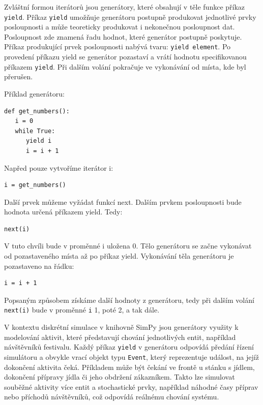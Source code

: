 \documentclass[12pt,a4paper]{article}
\begin{document}
Zvláštní formou iterátorů jsou generátory, které obsahují v těle funkce příkaz \texttt{yield}. Příkaz \texttt{yield} umožňuje generátoru postupně produkovat jednotlivé prvky posloupnosti a může teoreticky produkovat i nekonečnou posloupnost dat. Posloupnost zde znamená řadu hodnot, které generátor postupně poskytuje. Příkaz produkující prvek posloupnosti nabývá tvaru: \texttt{yield element}. Po provedení příkazu yield se generátor pozastaví a vrátí hodnotu specifikovanou příkazem \texttt{yield}. Při dalším volání pokračuje ve vykonávání od místa, kde byl přerušen.

\noindent Příklad generátoru:
 \begin{verbatim} 
def get_numbers():
   i = 0
   while True:
      yield i
      i = i + 1
\end{verbatim}
Napřed pouze vytvoříme iterátor i: 
 \begin{verbatim} 
i = get_numbers()
\end{verbatim}
Další prvek můžeme vyžádat funkcí next. 
Dalším prvkem posloupnosti bude hodnota určená příkazem yield. Tedy:
 \begin{verbatim} 
next(i)
\end{verbatim}
V tuto chvíli bude v proměnné i uložena 0. Tělo generátoru se začne vykonávat od pozastaveného místa až po příkaz yield.  Vykonávání těla generátoru je pozastaveno na řádku:
 \begin{verbatim} 
i = i + 1
\end{verbatim}
Popsaným způsobem získáme další hodnoty z generátoru, tedy při dalším volání \texttt{next(i)} bude v proměnné \texttt{i} 1, poté 2, a tak dále.

V kontextu diskrétní simulace v knihovně SimPy jsou generátory využity k modelování aktivit, které představují chování jednotlivých entit, například návštěvníků festivalu. Každý příkaz \texttt{yield} v generátoru odpovídá předání řízení simulátoru a obvykle vrací objekt typu \texttt{Event}, který reprezentuje událost, na jejíž dokončení aktivita čeká. Příkladem může být čekání ve frontě u stánku s jídlem, dokončení přípravy jídla či jeho obdržení zákazníkem. Takto lze simulovat souběžné aktivity více entit a stochastické prvky, například náhodné časy příprav nebo příchodů návštěvníků, což odpovídá reálnému chování systému.
\end{document}
